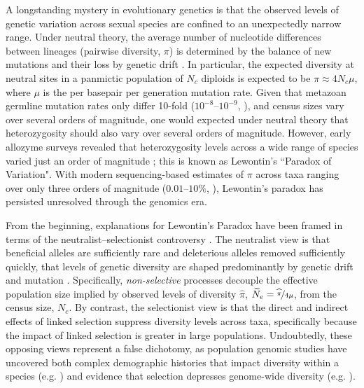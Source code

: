 \documentclass[11pt]{article}
\begin{document}
A longstanding mystery in evolutionary genetics is that the observed levels of
genetic variation across sexual species are confined to an unexpectedly narrow
range. Under neutral theory, the average number of nucleotide differences
between lineages (pairwise diversity, $\pi$) is determined by the balance of
new mutations and their loss by genetic drift
\parencite{Kimura1964-ul,Malecot1948-zv,Wright1931-fl}. In particular, the
expected diversity at neutral sites in a panmictic population of $N_c$ diploids
is expected to be $\pi \approx 4N_c \mu$, where $\mu$ is the per basepair per
generation mutation rate. Given that metazoan germline mutation rates only
differ 10-fold ($10^{-8}$--$10^{-9}$, \cite{Kondrashov2010-fi,Lynch2010-ki}),
and census sizes vary over several orders of magnitude, one would expected
under neutral theory that heterozygosity should also vary over several orders
of magnitude. However, early allozyme surveys revealed that heterozygosity
levels across a wide range of species varied just an order of magnitude
\parencite[][p.  208]{Lewontin1974-jb}; this is known as Lewontin's ``Paradox
of Variation".  With modern sequencing-based estimates of $\pi$ across taxa
ranging over only three orders of magnitude ($0.01$--$10\%$,
\cite{Leffler2012-zj}), Lewontin's paradox has persisted unresolved through the
genomics era.

From the beginning, explanations for Lewontin's Paradox have been framed in
terms of the neutralist--selectionist controversy
\parencite{Lewontin1974-jb,Kimura1984-ia,Gillespie1991-qa,Gillespie2001-mv}.
The neutralist view is that beneficial alleles are sufficiently rare and
deleterious alleles removed sufficiently quickly, that levels of genetic
diversity are shaped predominantly by genetic drift and mutation
\parencite{Kimura1984-ia}. Specifically, \emph{non-selective} processes
decouple the effective population size implied by observed levels of diversity
$\widehat{\pi}$, $\widetilde{N}_e = \nicefrac{\widehat{\pi}}{4\mu}$, from the
census size, $N_c$. By contrast, the selectionist view is that the direct and
indirect effects of linked selection suppress diversity levels across taxa,
specifically because the impact of linked selection is greater in large
populations. Undoubtedly, these opposing views represent a false dichotomy, as
population genomic studies have uncovered both complex demographic histories
that impact diversity within a species (e.g.
\cite{Zhao2013-vd,Palkopoulou2015-bg}) and evidence that selection depresses
genome-wide diversity (e.g.
\cite{Elyashiv2016-vt,Begun1992-ey,Aguade1989-jx,McVicker2009-ax}). 
\end{document}
